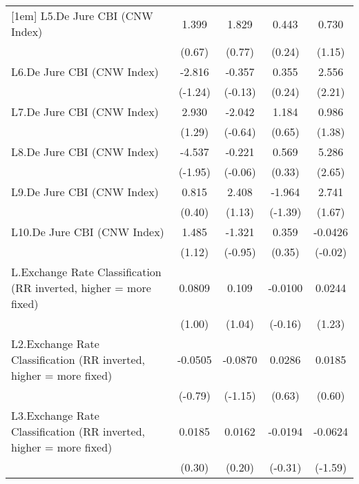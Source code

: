 {\begin{longtable}{l*{4}{c}}
[1em]
L5.De Jure CBI (CNW Index)&    1.399         &    1.829         &    0.443         &    0.730         \\
                &   (0.67)         &   (0.77)         &   (0.24)         &   (1.15)         \\
[1em]
L6.De Jure CBI (CNW Index)&   -2.816         &   -0.357         &    0.355         &    2.556\sym{*}  \\
                &  (-1.24)         &  (-0.13)         &   (0.24)         &   (2.21)         \\
[1em]
L7.De Jure CBI (CNW Index)&    2.930         &   -2.042         &    1.184         &    0.986         \\
                &   (1.29)         &  (-0.64)         &   (0.65)         &   (1.38)         \\
[1em]
L8.De Jure CBI (CNW Index)&   -4.537         &   -0.221         &    0.569         &    5.286\sym{**} \\
                &  (-1.95)         &  (-0.06)         &   (0.33)         &   (2.65)         \\
[1em]
L9.De Jure CBI (CNW Index)&    0.815         &    2.408         &   -1.964         &    2.741         \\
                &   (0.40)         &   (1.13)         &  (-1.39)         &   (1.67)         \\
[1em]
L10.De Jure CBI (CNW Index)&    1.485         &   -1.321         &    0.359         &  -0.0426         \\
                &   (1.12)         &  (-0.95)         &   (0.35)         &  (-0.02)         \\
[1em]
L.Exchange Rate Classification (RR inverted, higher = more fixed)&   0.0809         &    0.109         &  -0.0100         &   0.0244         \\
                &   (1.00)         &   (1.04)         &  (-0.16)         &   (1.23)         \\
[1em]
L2.Exchange Rate Classification (RR inverted, higher = more fixed)&  -0.0505         &  -0.0870         &   0.0286         &   0.0185         \\
                &  (-0.79)         &  (-1.15)         &   (0.63)         &   (0.60)         \\
[1em]
L3.Exchange Rate Classification (RR inverted, higher = more fixed)&   0.0185         &   0.0162         &  -0.0194         &  -0.0624         \\
                &   (0.30)         &   (0.20)         &  (-0.31)         &  (-1.59)         \\

\end{longtable}}
